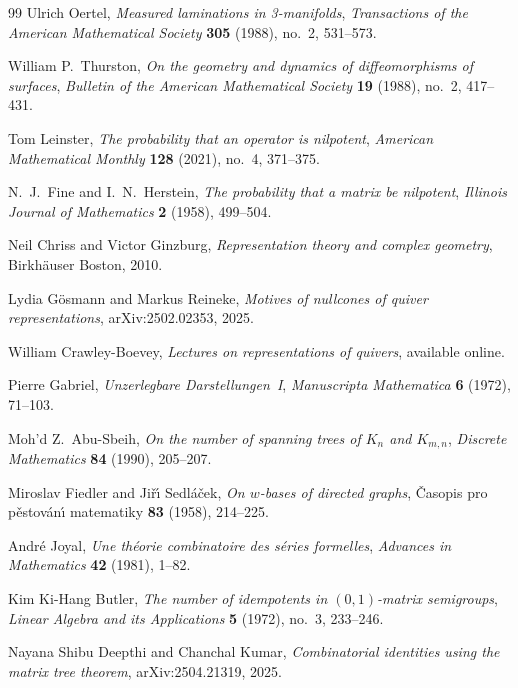 \documentclass[12pt, a4paper]{article}
\theoremstyle{plain}
\theoremstyle{definition}
\theoremstyle{correspondence}
\begin{document}
\begin{thebibliography}{99}
Ulrich Oertel,
\textit{Measured laminations in 3-manifolds},
\textit{Transactions of the American Mathematical Society} \textbf{305} (1988), no.~2, 531--573.

William P.~Thurston,
\textit{On the geometry and dynamics of diffeomorphisms of surfaces},
\textit{Bulletin of the American Mathematical Society} \textbf{19} (1988), no.~2, 417--431.


Tom Leinster,
\textit{The probability that an operator is nilpotent},
\textit{American Mathematical Monthly} \textbf{128} (2021), no.~4, 371--375.

N.~J.~Fine and I.~N.~Herstein,
\textit{The probability that a matrix be nilpotent},
\textit{Illinois Journal of Mathematics} \textbf{2} (1958), 499--504.

Neil Chriss and Victor Ginzburg,
\textit{Representation theory and complex geometry},
Birkh{\"a}user Boston, 2010.

Lydia G{\"o}smann and Markus Reineke,
\textit{Motives of nullcones of quiver representations},
arXiv:2502.02353, 2025.

William Crawley-Boevey,
\textit{Lectures on representations of quivers},
available online.

Pierre Gabriel,
\textit{Unzerlegbare Darstellungen~I},
\textit{Manuscripta Mathematica} \textbf{6} (1972), 71--103.

Moh'd Z.~Abu-Sbeih,
\textit{On the number of spanning trees of $K_n$ and $K_{m,n}$},
\textit{Discrete Mathematics} \textbf{84} (1990), 205--207.

Miroslav Fiedler and Ji\v{r}{\'{\i}} Sedl{\'a}\v{c}ek,
\textit{On $w$-bases of directed graphs},
\v{C}asopis pro p\v{e}stov{\'a}n{\'{\i}} matematiky \textbf{83} (1958), 214--225.

Andr{\'e} Joyal,
\textit{Une th{\'e}orie combinatoire des s{\'e}ries formelles},
\textit{Advances in Mathematics} \textbf{42} (1981), 1--82.

Kim Ki-Hang Butler,
\textit{The number of idempotents in $(0,1)$-matrix semigroups},
\textit{Linear Algebra and its Applications} \textbf{5} (1972), no.~3, 233--246.

Nayana Shibu Deepthi and Chanchal Kumar,
\textit{Combinatorial identities using the matrix tree theorem},
arXiv:2504.21319, 2025.


\end{thebibliography}
\end{document}
